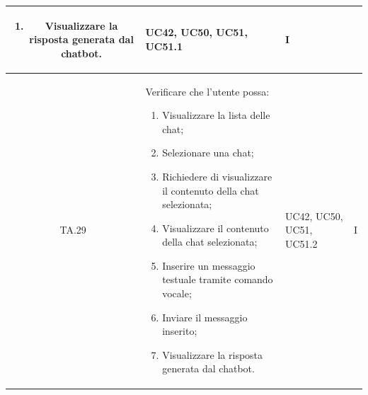 \documentclass[10pt, a4paper]{article}
\begin{document}
\begin{xltabular}{\textwidth}{|c|X|p{2.5cm}|c|}
\begin{enumerate}
    \item Visualizzare la risposta generata dal chatbot.
\end{enumerate}
& UC42, UC50, UC51, UC51.1 & I \\
\hline
TA.29 & Verificare che l'utente possa:
\begin{enumerate}
    \item Visualizzare la lista delle chat;
    \item Selezionare una chat;
    \item Richiedere di visualizzare il contenuto della chat selezionata;
    \item Visualizzare il contenuto della chat selezionata;
    \item Inserire un messaggio testuale tramite comando vocale;
    \item Inviare il messaggio inserito;
    \item Visualizzare la risposta generata dal chatbot.
\end{enumerate}
& UC42, UC50, UC51, UC51.2 & I \\
\hline


\end{xltabular}
\end{document}
